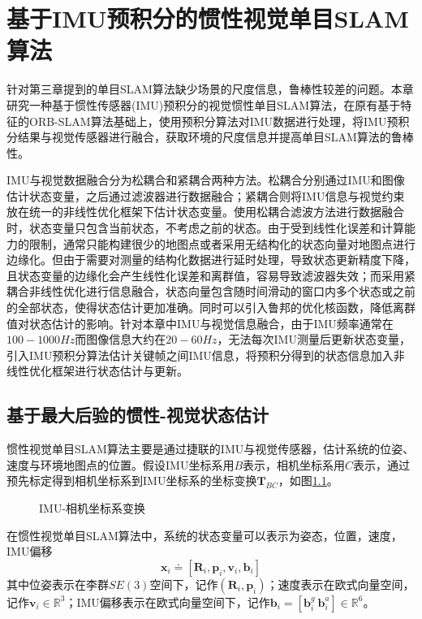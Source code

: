 
\chapter{基于IMU预积分的惯性视觉单目SLAM算法}
\label{chap:VISLAM}
针对第三章提到的单目SLAM算法缺少场景的尺度信息，鲁棒性较差的问题。本章研究一种基于惯性传感器(IMU)预积分的视觉惯性单目SLAM算法，在原有基于特征的ORB-SLAM算法基础上，使用预积分算法对IMU数据进行处理，将IMU预积分结果与视觉传感器进行融合，获取环境的尺度信息并提高单目SLAM算法的鲁棒性。

IMU与视觉数据融合分为松耦合和紧耦合两种方法。松耦合分别通过IMU和图像估计状态变量，之后通过滤波器进行数据融合；紧耦合则将IMU信息与视觉约束放在统一的非线性优化框架下估计状态变量。使用松耦合滤波方法进行数据融合时，状态变量只包含当前状态，不考虑之前的状态。由于受到线性化误差和计算能力的限制，通常只能构建很少的地图点或者采用无结构化的状态向量对地图点进行边缘化。但由于需要对测量的结构化数据进行延时处理，导致状态更新精度下降，且状态变量的边缘化会产生线性化误差和离群值，容易导致滤波器失效；而采用紧耦合非线性优化进行信息融合，状态向量包含随时间滑动的窗口内多个状态或之前的全部状态，使得状态估计更加准确。同时可以引入鲁邦的优化核函数，降低离群值对状态估计的影响。针对本章中IMU与视觉信息融合，由于IMU频率通常在$100-1000Hz$而图像信息大约在$20-60Hz$，无法每次IMU测量后更新状态变量，引入IMU预积分算法估计关键帧之间IMU信息，将预积分得到的状态信息加入非线性优化框架进行状态估计与更新。


\section{基于最大后验的惯性-视觉状态估计}
惯性视觉单目SLAM算法主要是通过捷联的IMU与视觉传感器，估计系统的位姿、速度与环境地图点的位置。假设IMU坐标系用$B$表示，相机坐标系用$C$表示，通过预先标定得到相机坐标系到IMU坐标系的坐标变换$\boldsymbol{T}_{BC}$，如图\ref{fig5.1}。
\begin{figure}
\centering
\caption{IMU-相机坐标系变换}
\label{fig5.1}
\end{figure}

在惯性视觉单目SLAM算法中，系统的状态变量可以表示为姿态，位置，速度，IMU偏移
\begin{equation}
\label{equ5.1}
\boldsymbol{x}_i \doteq \left[ \boldsymbol{R}_i,\boldsymbol{p}_i,\boldsymbol{v}_i,\boldsymbol{b}_i \right]
\end{equation}
其中位姿表示在李群$SE(3)$空间下，记作$\left( \boldsymbol{R}_i, \boldsymbol{p}_i \right)$；速度表示在欧式向量空间，记作$\boldsymbol{v}_i \in \mathds{R}^3 $；IMU偏移表示在欧式向量空间下，记作$\boldsymbol{b}_i=[\boldsymbol{b}_i^g \ \boldsymbol{b}_i^a] \in \mathds{R}^6$。

